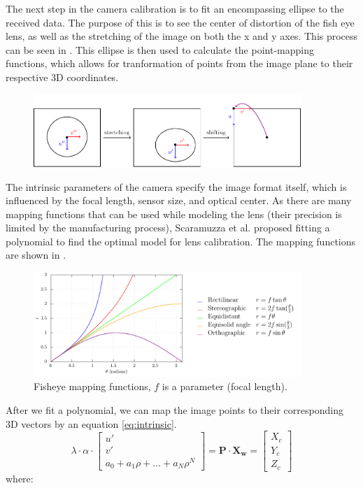 The next step in the camera calibration is to fit an encompassing ellipse to the received data. The purpose of this is to see the center of distortion of the fish eye lens, as well
as the stretching of the image on both the x and y axes. This process can be seen in . This ellipse is then used to calculate the point-mapping functions, which allows for tranformation of points from
the image plane to their respective 3D coordinates.
\begin{figure}[H]
	\centering
	\includegraphics[width=0.9\textwidth]{./fig/tikz/ellipse.pdf}
	\caption{}
	\label{fig:ellipse}
  \end{figure}
The intrinsic parameters of the camera specify the image format itself, which is influenced by the focal length, sensor size, and optical center. As there are many mapping
functions that can be used while modeling the lens (their precision is limited by the manufacturing process), Scaramuzza et al. \cite{scaramuzzacalibration} proposed
fitting a polynomial to find the optimal model for lens calibration. The mapping functions are shown in .
\begin{figure}[H]
  \centering
  \includegraphics[width=0.9\textwidth]{./fig/tikz/mapping.pdf}
  \caption{Fisheye mapping functions, $f$ is a parameter (focal length).}
  \label{fig:mapping_functions}
\end{figure}

After we fit a polynomial, we can map the image points to their corresponding 3D vectors by an equation \ref{eq:intrinsic}.
\begin{equation}
	\lambda \cdot \alpha \cdot
	\begin{bmatrix}
		u' \\
		v' \\
		a_0 + a_1 \rho + \dots + a_{N} \rho^{N} 
	\end{bmatrix}
	= \mathbf{P} \cdot \mathbf{X_w} = %
	\begin{bmatrix}
		X_c \\
		Y_c \\
		Z_c
	\end{bmatrix}
	\label{eq:intrinsic}
\end{equation}
where:

